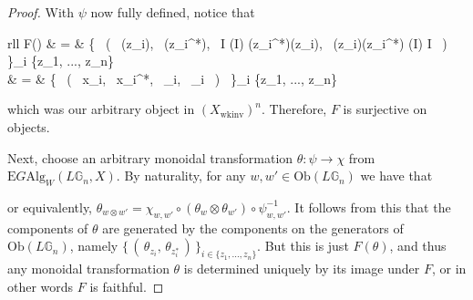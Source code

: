 \begin{proof}
With $\psi$ now fully defined, notice that
\begin{eq*} \begin{array}{rll}
		F(\psi) & = & \big\{ \, ( \, \psi(z_i), \, \psi(z_i^*), \, I \xrightarrow{\sim} \psi(I) \xrightarrow{\sim} \psi(z_i^*)\psi(z_i), \, \psi(z_i)\psi(z_i^*) \xrightarrow{\sim} \psi(I) \xrightarrow{\sim} I \, ) \, \big\}_{i \in \{z_1, ..., z_n\} } \\
		& = & \big\{ \, ( \, x_i, \, x_i^*, \, \eta_i, \, \epsilon_i \, ) \, \big\}_{i \in \{z_1, ..., z_n\} } \\
		\end{array}
\end{eq*}
which was our arbitrary object in $(X_{\mathrm{wkinv}})^n$. Therefore, $F$ is surjective on objects.

Next, choose an arbitrary monoidal transformation $\theta : \psi \to \chi$ from $\mathrm{E}G\mathrm{Alg}_W(L\mathbb{G}_n, X)$. By naturality, for any $w, w' \in \mathrm{Ob}(L\mathbb{G}_n)$ we have that
\begin{eq*}  \end{eq*}
or equivalently, $\theta_{w \otimes w'} = \chi_{w, w'} \circ (\theta_w \otimes \theta_{w'}) \circ \psi_{w, w'}^{-1}$. It follows from this that the components of $\theta$ are generated by the components on the generators of $\mathrm{Ob}(L\mathbb{G}_n)$, namely $\{ \, ( \, \theta_{z_i}, \, \theta_{z_i^*} \, ) \, \}_{i \in \{z_1, ..., z_n\} }$. But this is just $F(\theta)$, and thus any monoidal transformation $\theta$ is determined uniquely by its image under $F$, or in other words $F$ is faithful.


\end{proof}
